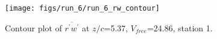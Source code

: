 \begin{figure}[H]
\centering
\texttt{[image: figs/run\_6/run\_6\_rw\_contour]}
\caption{Contour plot of $\overline{r^\prime w^\prime}$ at $z/c$=5.37, $V_{free}$=24.86, station 1.}
\label{fig:run_6_rw_contour}
\end{figure}


